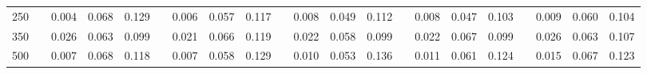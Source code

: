 % 
\begin{tabular}{ccccccccccccccccccccc}
  \hline
  \hline
250 &  & 0.004 & 0.068 & 0.129 &  & 0.006 & 0.057 & 0.117 &  & 0.008 & 0.049 & 0.112 &  & 0.008 & 0.047 & 0.103 &  & 0.009 & 0.060 & 0.104 \\ 
  350 &  & 0.026 & 0.063 & 0.099 &  & 0.021 & 0.066 & 0.119 &  & 0.022 & 0.058 & 0.099 &  & 0.022 & 0.067 & 0.099 &  & 0.026 & 0.063 & 0.107 \\ 
  500 &  & 0.007 & 0.068 & 0.118 &  & 0.007 & 0.058 & 0.129 &  & 0.010 & 0.053 & 0.136 &  & 0.011 & 0.061 & 0.124 &  & 0.015 & 0.067 & 0.123 \\ 
   \hline
\end{tabular}

